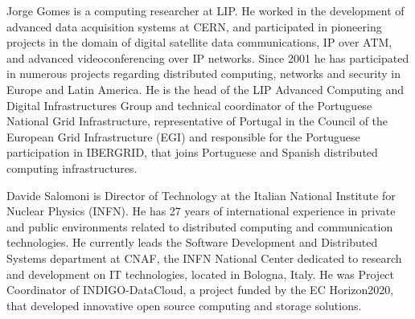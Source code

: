 \documentclass[journal]{IEEEtran}
\begin{document}
\begin{IEEEbiography}{Jorge Gomes}
is a computing researcher at LIP. He worked in the development of advanced data acquisition systems at CERN, and participated in pioneering projects in the domain of digital satellite data communications, IP over ATM, and advanced videoconferencing over IP networks. Since 2001 he has participated in numerous projects regarding distributed computing, networks and security in Europe and Latin America. He is the head of the LIP Advanced Computing and Digital Infrastructures Group and technical coordinator of the Portuguese National Grid Infrastructure, representative of Portugal in the Council of the European Grid Infrastructure (EGI) and responsible for the Portuguese participation in IBERGRID, that joins Portuguese and Spanish distributed computing infrastructures.
\end{IEEEbiography}

\begin{IEEEbiography}{Davide Salomoni}
is Director of Technology at the Italian National Institute for Nuclear Physics (INFN). He has 27 years of international experience in private and public environments related to distributed computing and communication technologies. He currently leads the Software Development and Distributed Systems department at CNAF, the INFN National Center dedicated to research and development on IT technologies, located in Bologna, Italy. He was Project Coordinator of INDIGO-DataCloud, a project funded by the EC Horizon2020, that developed innovative open source computing and storage solutions.
\end{IEEEbiography}
\end{document}
